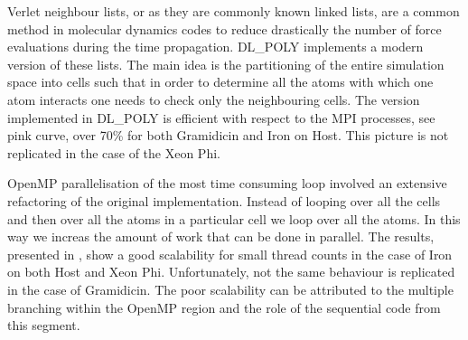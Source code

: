 \par{Verlet neighbour lists, or as they are commonly known linked lists, are a common method in 
molecular dynamics codes to reduce drastically the number of force evaluations
during the time propagation\cite{Verlet1997}. DL\_POLY implements a modern version
of these lists\cite{Pinches1991,Smith1994,Hockney1981}. The main idea is the partitioning of the entire simulation
space into cells such that in order to determine all the atoms with which one atom interacts one needs to check 
only the neighbouring cells. The version implemented in DL\_POLY is efficient with respect to the 
MPI processes, see  pink curve, over 70\% for both Gramidicin and Iron on Host. This picture 
is not replicated in the case of the Xeon Phi.}

\par{OpenMP parallelisation of the most time consuming loop involved an extensive refactoring of the original 
implementation. Instead of looping over all the cells and then over all the atoms in a particular cell 
we loop over all the atoms. In this way we increas the amount of work that can be done in parallel. The results, 
presented in , show a good scalability for small thread counts in the case of Iron on both Host 
and Xeon Phi. Unfortunately, not the same behaviour is replicated in the case of Gramidicin. The poor scalability 
can be attributed to the multiple branching within the OpenMP region and the role of the sequential code from this segment.}
